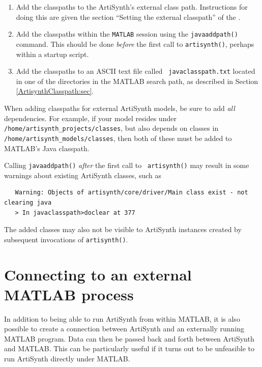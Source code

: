 \documentclass{article}
\begin{document}
\begin{enumerate}

\item Add the classpaths to the ArtiSynth's external class path.
Instructions for doing this are given the section ``Setting the
external classpath'' of the .

\item Add the classpaths within the {\tt MATLAB} session using the
{\tt javaaddpath()} command. This should be done {\it before} the
first call to {\tt artisynth()}, perhaps within a startup script.

\item Add the classpaths to an ASCII text file called {\tt
javaclasspath.txt} located in one of the directories in the MATLAB
search path, as described in Section \ref{ArtisynthClasspath:sec}.

\end{enumerate}

\begin{sideblock}
When adding classpaths for external ArtiSynth models, be sure to add
{\it all} dependencies. For example, if your model resides under {\tt
/home/artisynth\_projects/classes}, but also depends on classes in {\tt
/home/artisynth\_models/classes}, then both of these must be added to
MATLAB's Java classpath.
\end{sideblock}

\begin{sideblock}
Calling {\tt javaaddpath()}
{\it after} the first call to {\tt
artisynth()} may result in some warnings about existing
ArtiSynth classes, such as
\begin{verbatim}
   Warning: Objects of artisynth/core/driver/Main class exist - not clearing java 
   > In javaclasspath>doclear at 377
\end{verbatim}
The added classes may also not be visible to ArtiSynth instances
created by subsequent invocations of {\tt artisynth()}.
\end{sideblock}

\section{Connecting to an external MATLAB process}

In addition to being able to run ArtiSynth from within MATLAB, it is
also possible to create a connection between ArtiSynth and an
externally running MATLAB program. Data can then be passed back and
forth between ArtiSynth and MATLAB. This can be particularly useful if
it turns out to be unfeasible to run ArtiSynth directly under MATLAB.
\end{document}
